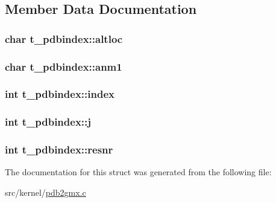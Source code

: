 \subsection{\-Member \-Data \-Documentation}
\hypertarget{structt__pdbindex_a60a58fcbb512963a2138a2d6e6797d6c}{
\subsubsection[{altloc}]{\setlength{\rightskip}{0pt plus 5cm}char {\bf t\-\_\-pdbindex\-::altloc}}}\label{structt__pdbindex_a60a58fcbb512963a2138a2d6e6797d6c}
\hypertarget{structt__pdbindex_aee519424c2e6d3419fdde3b6c7bffeeb}{
\subsubsection[{anm1}]{\setlength{\rightskip}{0pt plus 5cm}char {\bf t\-\_\-pdbindex\-::anm1}}}\label{structt__pdbindex_aee519424c2e6d3419fdde3b6c7bffeeb}
\hypertarget{structt__pdbindex_abd6de05cb79eed09d021bcb051ca1309}{
\subsubsection[{index}]{\setlength{\rightskip}{0pt plus 5cm}int {\bf t\-\_\-pdbindex\-::index}}}\label{structt__pdbindex_abd6de05cb79eed09d021bcb051ca1309}
\hypertarget{structt__pdbindex_a4b617779c2bad24eb7be1e0f283a24eb}{
\subsubsection[{j}]{\setlength{\rightskip}{0pt plus 5cm}int {\bf t\-\_\-pdbindex\-::j}}}\label{structt__pdbindex_a4b617779c2bad24eb7be1e0f283a24eb}
\hypertarget{structt__pdbindex_ac5b86256452cafa3f1fce790b7a724e4}{
\subsubsection[{resnr}]{\setlength{\rightskip}{0pt plus 5cm}int {\bf t\-\_\-pdbindex\-::resnr}}}\label{structt__pdbindex_ac5b86256452cafa3f1fce790b7a724e4}


\-The documentation for this struct was generated from the following file\-:\begin{DoxyCompactItemize}
\item 
src/kernel/\hyperlink{pdb2gmx_8c}{pdb2gmx.\-c}\end{DoxyCompactItemize}
